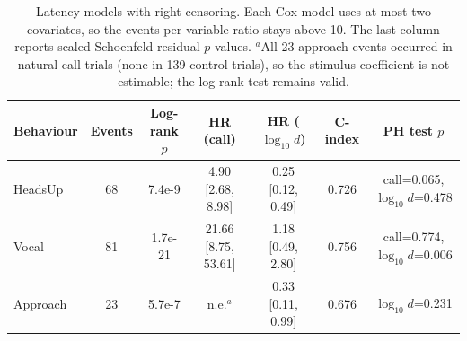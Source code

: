 \begin{table}[!ht]
\centering
\setlength{\tabcolsep}{4pt}
\caption{Latency models with right-censoring. Each Cox model uses at most two
covariates, so the events-per-variable ratio stays above 10. The last column reports
scaled Schoenfeld residual $p$ values. $^{a}$All 23 approach events occurred in
natural-call trials (none in 139 control trials), so the stimulus coefficient is not
estimable; the log-rank test remains valid.}
\label{tab:surv}
\scriptsize
\begin{tabular}{lcccccc}
\toprule
Behaviour & Events & Log-rank $p$ & HR (call) & HR ($\log_{10}d$) & C-index & PH test $p$\\
\midrule
HeadsUp & 68 & 7.4e-9 & 4.90 [2.68, 8.98] & 0.25 [0.12, 0.49] & 0.726 & call=0.065, $\log_{10}d$=0.478\\
Vocal & 81 & 1.7e-21 & 21.66 [8.75, 53.61] & 1.18 [0.49, 2.80] & 0.756 & call=0.774, $\log_{10}d$=0.006\\
Approach & 23 & 5.7e-7 & n.e.$^{a}$ & 0.33 [0.11, 0.99] & 0.676 & $\log_{10}d$=0.231\\
\bottomrule
\end{tabular}
\end{table}

